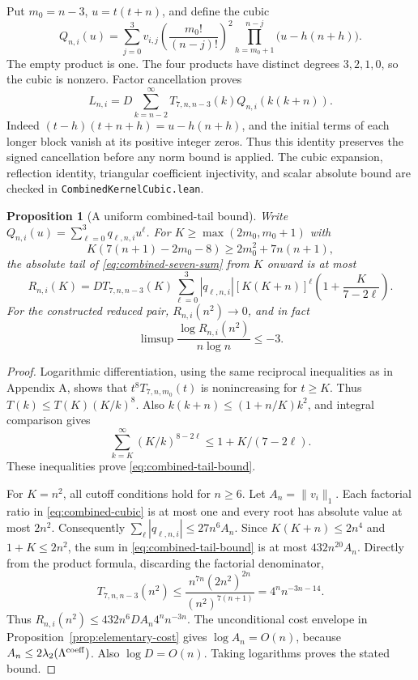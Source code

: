 \documentclass[11pt]{article}
\newtheorem{proposition}[theorem]{Proposition}
\theoremstyle{remark}
\begin{document}
Put \(m_0=n-3\), \(u=t(t+n)\), and define the cubic
\begin{equation}
 Q_{n,i}(u)=\sum_{j=0}^3 v_{i,j}
       \left(\frac{m_0!}{(n-j)!}\right)^2
       \prod_{h=m_0+1}^{n-j}\bigl(u-h(n+h)\bigr).
 \label{eq:combined-cubic}
\end{equation}
The empty product is one. The four products have distinct degrees
\(3,2,1,0\), so the cubic is nonzero. Factor cancellation proves
\begin{equation}
 L_{n,i}=D\sum_{k=n-2}^{\infty}
       T_{7,n,n-3}(k)Q_{n,i}(k(k+n)).
 \label{eq:combined-seven-sum}
\end{equation}
Indeed \((t-h)(t+n+h)=u-h(n+h)\), and the initial terms of each
longer block vanish at its positive integer zeros. Thus this identity
preserves the signed cancellation before any norm bound is applied.
The cubic expansion, reflection identity, triangular coefficient
injectivity, and scalar absolute bound are checked in
\texttt{CombinedKernelCubic.lean}.

\begin{proposition}[A uniform combined-tail bound]
\label{prop:combined-tail}
Write \(Q_{n,i}(u)=\sum_{\ell=0}^3q_{\ell,n,i}u^\ell\).
For \(K\ge\max(2m_0,m_0+1)\) with
\[
 K(7(n+1)-2m_0-8)\ge2m_0^2+7n(n+1),
\]
the absolute tail of \eqref{eq:combined-seven-sum} from \(K\) onward
is at most
\begin{equation}
 R_{n,i}(K)=D T_{7,n,n-3}(K)
  \sum_{\ell=0}^3|q_{\ell,n,i}|[K(K+n)]^\ell
                     \left(1+\frac K{7-2\ell}\right).
 \label{eq:combined-tail-bound}
\end{equation}
For the constructed reduced pair, \(R_{n,i}(n^2)\to0\), and in fact
\[
 \limsup\frac{\log R_{n,i}(n^2)}{n\log n}\le-3.
\]
\end{proposition}
\begin{proof}
Logarithmic differentiation, using the same reciprocal inequalities as
in Appendix A, shows that \(t^8T_{7,n,m_0}(t)\) is nonincreasing for
\(t\ge K\). Thus \(T(k)\le T(K)(K/k)^8\). Also
\(k(k+n)\le(1+n/K)k^2\), and integral comparison gives
\[
 \sum_{k=K}^{\infty}(K/k)^{8-2\ell}
       \le1+K/(7-2\ell).
\]
These inequalities prove \eqref{eq:combined-tail-bound}.

For \(K=n^2\), all cutoff conditions hold for \(n\ge6\).
Let \(A_n=\|v_i\|_1\). Each factorial ratio in
\eqref{eq:combined-cubic} is at most one and every root has absolute
value at most \(2n^2\). Consequently
\(\sum_\ell|q_{\ell,n,i}|\le27n^6A_n\).
Since \(K(K+n)\le2n^4\) and \(1+K\le2n^2\), the sum in
\eqref{eq:combined-tail-bound} is at most \(432n^{20}A_n\).
Directly from the product formula, discarding the factorial denominator,
\[
 T_{7,n,n-3}(n^2)
 \le\frac{n^{7n}(2n^2)^{2n}}{(n^2)^{7(n+1)}}
 =4^n n^{-3n-14}.
\]
Thus \(R_{n,i}(n^2)\le432n^6D A_n4^n n^{-3n}\).
The unconditional cost envelope in
Proposition~\ref{prop:elementary-cost} gives \(\log A_n=O(n)\),
because \(A_n\le2\lambda_2(\Lambda^{\rm coeff})\).
Also \(\log D=O(n)\). Taking logarithms proves the stated bound.
\end{proof}
\end{document}
